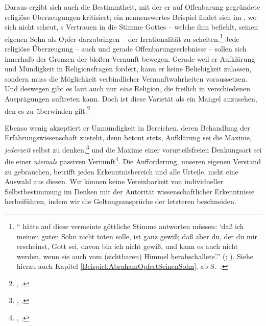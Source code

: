 Daraus ergibt sich auch die Bestimmtheit, mit der er auf Offenbarung gegründete
religiöse Überzeugungen kritisiert; ein nennenswertes Beispiel findet sich im
, wo  sich nicht scheut,
s Vertrauen in die Stimme Gottes -- welche ihm befiehlt,
seinen eigenen Sohn als Opfer darzubringen -- der Irrationalität zu
schelten.\footnote{\enquote{ hätte auf diese vermeinte
göttliche Stimme antworten müssen: \enquote{daß ich meinen guten Sohn nicht töten solle, ist ganz
gewiß; daß aber du, der du mir erscheinst, Gott sei, davon bin ich nicht gewiß,
und kann es auch nicht werden, wenn sie auch vom (sichtbaren) Himmel
herabschallete}.} \mkbibparens{\cite[][A
102\,f.]{Kant:DerStreitderFakultaeten1977}; \cite[][VII:
63.34--38]{Kant:GesammelteWerke1900ff.}}. Siehe hierzu auch Kapitel
\ref{Beispiel:AbrahamOpfertSeinenSohn}, ab
S.~\pageref{Beispiel:AbrahamOpfertSeinenSohn}.} Jede religiöse Überzeugung --
auch und gerade Offenbarungserlebnisse -- sollen sich innerhalb der Grenzen der
bloßen Vernunft bewegen. Gerade weil er Aufklärung und Mündigkeit in
Religionsfragen fordert, kann er keine Beliebigkeit zulassen, sondern muss die Möglichkeit verbindlicher
Vernunftwahrheiten voraussetzen. Und deswegen gibt es laut 
auch nur \emph{eine} Religion, die freilich in verschiedenen Ausprägungen
auftreten kann. Doch ist diese Varietät als ein Mangel anzusehen, den es zu
überwinden gilt.\footnote{\cite[Vgl.][B
167--183]{Kant:DieReligioninnerhalbderGrenzenderblossenVernunft1977}, \cite[VI:
115.1--124.5]{Kant:GesammelteWerke1900ff.}.}

\label{Absatz:UniversalitaetderAufklaerung} Ebenso wenig
akzeptiert er Unmündigkeit in Bereichen, deren Behandlung der
Erfahrungswissenschaft zusteht, denn  betont stets,
Aufklärung sei die Maxime, \emph{jederzeit} selbst zu
denken,\footnote{\cite[Vgl.][A
229]{Kant:Washeisst:SichimDenkenorientieren?1977}, \cite[VIII:
146.30--31]{Kant:GesammelteWerke1900ff.}.} und die Maxime einer vorurteilsfreien
Denkungsart sei die einer \emph{niemals} passiven
Vernunft\footnote{\cite[Vgl.][\S~40]{Kant:KritikderUrteilskraft2009}, \cite[V:
294.20]{Kant:GesammelteWerke1900ff.}.}. Die Aufforderung, unseren eigenen
Verstand zu gebrauchen, betrifft jeden Erkenntnisbereich und alle Urteile, nicht
eine Auswahl aus diesen. Wir können keine Vereinbarkeit von individueller
Selbstbestimmung im Denken mit der Autorität wissenschaftlicher Erkenntnisse
herbeiführen, indem wir die Geltungsansprüche der letzteren beschneiden.

